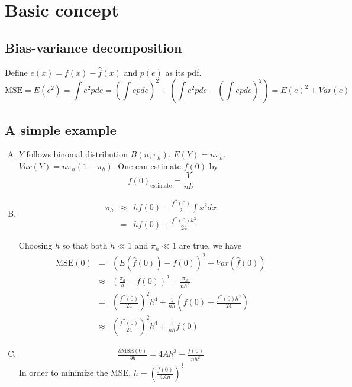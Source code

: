 \documentclass{article}
\begin{document}
\section{Basic concept}
\subsection{Bias-variance decomposition}
Define $e(x)=f(x)-\hat{f}(x)$ and $p(e)$ as its pdf.
\begin{equation}
\textrm{MSE}=E(e^2)=\int e^2pde=(\int epde)^2+(\int e^2pde-(\int epde)^2)=E(e)^2+Var(e)
\end{equation}
\subsection{A simple example}
\begin{enumerate}[(A)]
\item
$Y$ follows binomal distribution $B(n,\pi_h)$. $E(Y)=n\pi_h$, $Var(Y)=n\pi_h(1-\pi_h)$. One can estimate $f(0)$ by
\begin{equation}
f(0)_{\textrm{estimate}}=\frac{Y}{nh}
\end{equation}
\item
\begin{eqnarray}
\pi_h&\approx&hf(0)+\frac{f^{\prime\prime}(0)}{2}\int x^2dx\nonumber\\
&=&hf(0)+\frac{f^{\prime\prime}(0)h^3}{24}
\end{eqnarray}

Choosing $h$ so that both $h\ll 1$ and $\pi_h\ll 1$ are true, we have
\begin{eqnarray}
\textrm{MSE}(0)&=&(E(\hat{f}(0))-f(0))^2+Var(\hat{f}(0))\nonumber\\
&\approx&(\frac{\pi_h}{h}-f(0))^2+\frac{\pi_h}{nh^2}\nonumber\\
&=&(\frac{f^{\prime\prime}(0)}{24})^2h^4+\frac{1}{nh}(f(0)+\frac{f^{\prime\prime}(0)h^2}{24})\nonumber\\
&\approx&(\frac{f^{\prime\prime}(0)}{24})^2h^4+\frac{1}{nh}f(0)
\end{eqnarray}
\item
\begin{eqnarray}
\frac{\partial\textrm{MSE}(0)}{\partial h}=4Ah^3-\frac{f(0)}{nh^2}
\end{eqnarray}
In order to minimize the MSE, $h=(\frac{f(0)}{4An})^{\frac{1}{5}}$
\end{enumerate}
\end{document}
